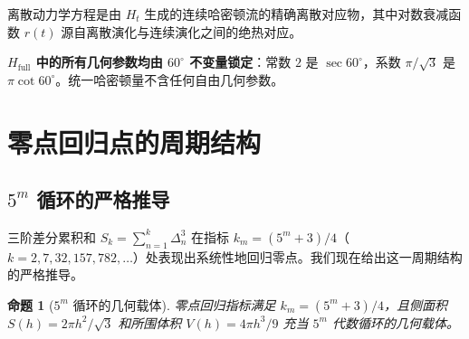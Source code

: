 \documentclass[12pt,a4paper]{article}
\newtheorem{proposition}[theorem]{命题}
\begin{document}
离散动力学方程是由 $H_t$ 生成的连续哈密顿流的精确离散对应物，其中对数衰减函数 $r(t)$ 源自离散演化与连续演化之间的绝热对应。

\textbf{$H_{\text{full}}$ 中的所有几何参数均由 $60^\circ$ 不变量锁定}：常数 $2$ 是 $\sec 60^\circ$，系数 $\pi/\sqrt{3}$ 是 $\pi\cot 60^\circ$。统一哈密顿量不含任何自由几何参数。

\section{零点回归点的周期结构}

\subsection{$5^m$ 循环的严格推导}

三阶差分累积和 $S_k = \sum_{n=1}^k \Delta_n^3$ 在指标 $k_m = (5^m+3)/4$（$k = 2, 7, 32, 157, 782, \dots$）处表现出系统性地回归零点。我们现在给出这一周期结构的严格推导。

\begin{proposition}[$5^m$ 循环的几何载体]
\label{prop:periodic}
零点回归指标满足 $k_m = (5^m+3)/4$，且侧面积 $S(h) = 2\pi h^2/\sqrt{3}$ 和所围体积 $V(h) = 4\pi h^3/9$ 充当 $5^m$ 代数循环的几何载体。
\end{proposition}
\end{document}

